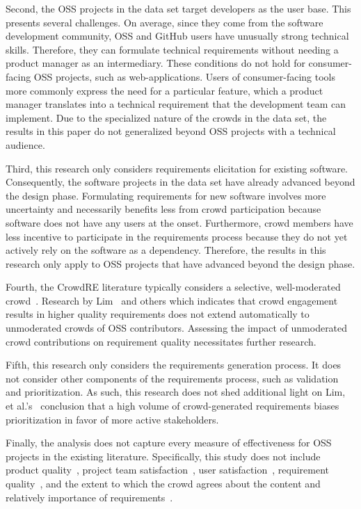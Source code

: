 Second, the OSS projects in the data set target developers as the user base. This presents several challenges. On average, since they come from the software development community, OSS and GitHub users have unusually strong technical skills. Therefore, they can formulate technical requirements without needing a product manager as an intermediary. These conditions do not hold for consumer-facing OSS projects, such as web-applications. Users of consumer-facing tools more commonly express the need for a particular feature, which a product manager translates into a technical requirement that the development team can implement. Due to the specialized nature of the crowds in the data set, the results in this paper do not generalized beyond OSS projects with a technical audience.

Third, this research only considers requirements elicitation for existing software. Consequently, the software projects in the data set have already advanced beyond the design phase. Formulating requirements for new software involves more uncertainty and necessarily benefits less from crowd participation because software does not have any users at the onset. Furthermore, crowd members have less incentive to participate in the requirements process because they do not yet actively rely on the software as a dependency. Therefore, the results in this research only apply to OSS projects that have advanced beyond the design phase.

Fourth, the CrowdRE literature typically considers a selective, well-moderated crowd~\cite{stakerare}. Research by Lim~\cite{stakerare, stakesource, lim} and others which indicates that crowd engagement results in higher quality requirements does not extend automatically to unmoderated crowds of OSS contributors. Assessing the impact of unmoderated crowd contributions on requirement quality necessitates further research.

Fifth, this research only considers the requirements generation process. It does not consider other components of the requirements process, such as validation and prioritization. As such, this research does not shed additional light on Lim, et al.'s~\cite{stakenet} conclusion that a high volume of crowd-generated requirements biases prioritization in favor of more active stakeholders.

Finally, the analysis does not capture every measure of effectiveness for OSS projects in the existing literature. Specifically, this study does not include product quality~\cite{stewart}, project team satisfaction~\cite{ghapanchi}, user satisfaction~\cite{ghapanchi}, requirement quality~\cite{ma}, and the extent to which the crowd agrees about the content and relatively importance of requirements~\cite{ma}. 

